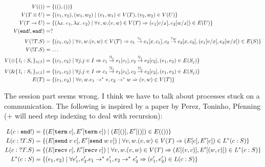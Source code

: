 \begin{align*}
  V (()) & = \{ ((), ()) \}
  \\
  V (T \otimes U) & = \{ (v_1, v_2), (w_1, w_2) \mid (v_1, w_1) \in V (T), (v_2, w_2) \in V (U) \}
  \\
  V (T \rightarrow U) &= \{ (\lambda x.\;e_1, \lambda x.\;e_2) \mid \forall v, w. (v, w) \in V (T) \Rightarrow (e_1[v/x], e_2[w/x]) \in E (U)  \}
  \\
  V (\mathtt{end !}, \mathtt{end !}) &= ?
  \\
  V ({}?T.S) &= \{ (c_1, c_2) \mid \forall v, w. (v,w) \in V(T) \Rightarrow
                c_1 \stackrel{?v}{\to} e_1[x,c_1],
                c_2 \stackrel{?w}{\to} e_2[x,c_2],
                (e_1[v/x], e_2[w/x]) \in E(S) \}
  \\
  V ({}!T.S) &= \dots
  \\
  V (\oplus\{\, l_i: S_i \,\}_{i \in I}) &=  \{ (c_1, c_2) \mid \forall j. j \in I \Rightarrow
                c_1 \stackrel{!l_j}{\to} e_1[c_1],
                c_2 \stackrel{!l_j}{\to} e_2[c_2],
                           (e_1, e_2) \in E(S_j) \}
  \\
  V (\&\{\, l_i: S_i \,\}_{i \in I}) &=  \{ (c_1, c_2) \mid \forall j. j \in I \Rightarrow
                c_1 \stackrel{?l_j}{\to} e_1[c_1],
                c_2 \stackrel{?l_j}{\to} e_2[c_2],
                         (e_1, e_2) \in E(S_j) \}
  \\
  E (T) &= \{ (e_1, e_2) \mid \forall v, w. e_1 \to^* v, e_2 \to^* w \Rightarrow (v, w)\in V (T) \}
\end{align*}

The session part seems wrong. I think we have to talk about processes stuck on a communication.
The following is inspired by a paper by Perez, Toninho, Pfenning ($+$ will need step indexing to deal with recursion): 

\begin{align*}
  L (c : \mathtt{end !}) &= \{ (E[ \mathtt{term}\; c ], E'[ \mathtt{term}\; c ]) \mid (E[()], E'[()]) \in E (())
                   \}
  \\
  L (c : {}!T.S) &= \{ (E[ \mathtt{send}\; v \; c ], E'[ \mathtt{send}\; w \; c ]) \mid \forall v, w. (v, w) \in V (T) \Rightarrow (E[c], E'[c]) \in L^* (c : S) \}
  \\
  L (c : {}?T.S) &= \{ (E[ \mathtt{recv}\; c ], E'[ \mathtt{recv}\; c ]) \mid \forall v, w. (v, w) \in V (T) \Rightarrow (E[(v,c)], E'[(w,c)]) \in L^* (c : S) \}
  \\
  L^* (c : S) &= \{ (e_1, e_2) \mid \forall e_1', e_2'. e_1 \to^* e_1', e_2 \to^* e_2' \Rightarrow (e_1', e_2') \in L (c : S) \}
\end{align*}

